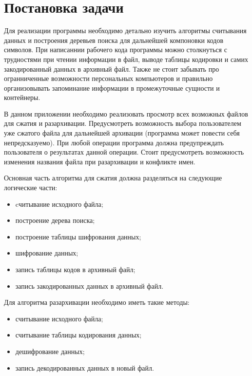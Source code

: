 \section{Постановка задачи}
\label{sec:task}

Для реализации программы необходимо детально изучить алгоритмы считывания данных и построения деревьев поиска для дальнейшей компоновки кодов символов.
При написаннии рабочего кода программы можно столкнуться с трудностями при чтении информации в файл, выводе таблицы кодировки и самих закодированный данных в архивный файл.
Также не стоит забывать про огранниченные возможности персональных компьютеров и правильно организовывать запоминание информации в промежуточные сущности и контейнеры.



В данном приложении необходимо реализовать просмотр всех возможных файлов для сжатия и разархивации. 
Предусмотреть возможность выбора пользователем уже сжатого файла для дальнейшей архивации (программа может повести себя непредсказуемо).
При любой операции программа должна предупреждать пользователя о результатах данной операции.
Стоит предусмотреть возможность изменения названия файла при разархивации и конфликте имен.



Основная часть алгоритма для сжатия должна разделяться на следующие логические части:
\begin{itemize}
    \item cчитывание исходного файла;
    \item построение дерева поиска;
    \item построение таблицы шифрования данных;
    \item шифрование данных;
    \item запись таблицы кодов в архивный файл;
    \item запись закодированных данных в архивный файл.
\end{itemize}



Для алгоритма разархивации необходимо иметь такие методы:

\begin{itemize}
    \item считывание исходного файла;
    \item считывание таблицы кодирования данных;
    \item дешифрование данных;
    \item запись декодированных данных в новый файл.
\end{itemize}
